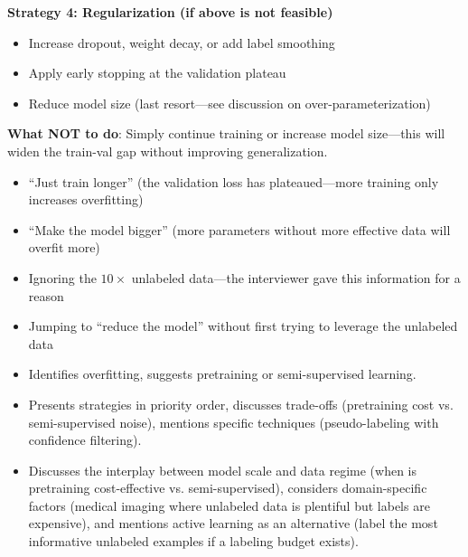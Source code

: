 \begin{interviewq}
\textbf{Strategy 4: Regularization (if above is not feasible)}
\begin{itemize}
    \item Increase dropout, weight decay, or add label smoothing
    \item Apply early stopping at the validation plateau
    \item Reduce model size (last resort---see discussion on over-parameterization)
\end{itemize}

\textbf{What NOT to do}: Simply continue training or increase model size---this will widen the train-val gap without improving generalization.

\redflags
\begin{itemize}
    \item ``Just train longer'' (the validation loss has plateaued---more training only increases overfitting)
    \item ``Make the model bigger'' (more parameters without more effective data will overfit more)
    \item Ignoring the $10\times$ unlabeled data---the interviewer gave this information for a reason
    \item Jumping to ``reduce the model'' without first trying to leverage the unlabeled data
\end{itemize}


\goodgreat
\begin{itemize}
    \item {} Identifies overfitting, suggests pretraining or semi-supervised learning.
    \item {} Presents strategies in priority order, discusses trade-offs (pretraining cost vs. semi-supervised noise), mentions specific techniques (pseudo-labeling with confidence filtering).
    \item {} Discusses the interplay between model scale and data regime (when is pretraining cost-effective vs. semi-supervised), considers domain-specific factors (medical imaging where unlabeled data is plentiful but labels are expensive), and mentions active learning as an alternative (label the most informative unlabeled examples if a labeling budget exists).
\end{itemize}

\end{interviewq}

